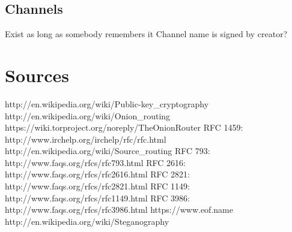 \documentclass[12pt,a4paper]{book}
\begin{document}
\section{Channels}
Exist as long as somebody remembers it
Channel name is signed by creator?
\appendix
\chapter{Sources}
\begin{thebibliography}{42}
 http://en.wikipedia.org/wiki/Public-key\_cryptography
 http://en.wikipedia.org/wiki/Onion\_routing
 https://wiki.torproject.org/noreply/TheOnionRouter
 RFC 1459: http://www.irchelp.org/irchelp/rfc/rfc.html
 http://en.wikipedia.org/wiki/Source\_routing
 RFC 793: http://www.faqs.org/rfcs/rfc793.html
 RFC 2616: http://www.faqs.org/rfcs/rfc2616.html
 RFC 2821: http://www.faqs.org/rfcs/rfc2821.html
 RFC 1149: http://www.faqs.org/rfcs/rfc1149.html
 RFC 3986: http://www.faqs.org/rfcs/rfc3986.html
 https://www.eof.name
 http://en.wikipedia.org/wiki/Steganography
\end{thebibliography}

\printindex
\end{document}
